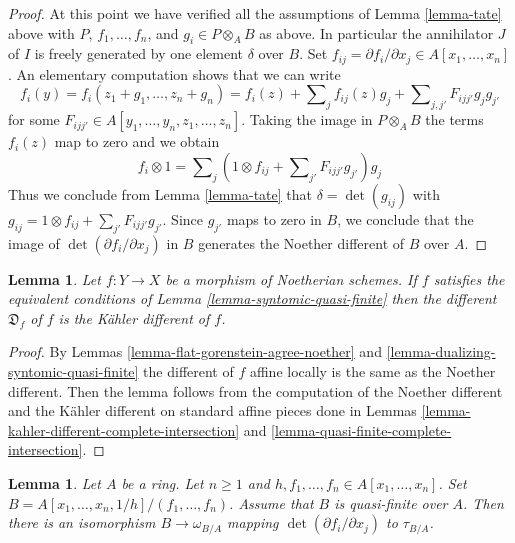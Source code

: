 \documentclass{stacks-project}
\theoremstyle{plain}
\newtheorem{lemma}[subsection]{Lemma}
\theoremstyle{definition}
\theoremstyle{remark}
\numberwithin{equation}{subsection}
\begin{document}
\begin{proof}
\medskip\noindent
At this point we have verified all the assumptions of Lemma \ref{lemma-tate}
above with $P$, $f_1, \ldots, f_n$, and $g_i \in P \otimes_A B$ as above.
In particular the annihilator $J$ of $I$ is freely generated by one
element $\delta$ over $B$.
Set $f_{ij} = \partial f_i/\partial x_j \in A[x_1, \ldots, x_n]$.
An elementary computation shows that we can write
$$
f_i(y) =
f_i(z_1 + g_1, \ldots, z_n + g_n) =
f_i(z) + \sum\nolimits_j f_{ij}(z) g_j +
\sum\nolimits_{j, j'} F_{ijj'}g_jg_{j'}
$$
for some $F_{ijj'} \in A[y_1, \ldots, y_n, z_1, \ldots, z_n]$.
Taking the image in $P \otimes_A B$ the terms $f_i(z)$ map to
zero and we obtain
$$
f_i \otimes 1 = \sum\nolimits_j
\left(1 \otimes f_{ij} + \sum\nolimits_{j'} F_{ijj'}g_{j'}\right)g_j
$$
Thus we conclude from Lemma \ref{lemma-tate}
that $\delta = \det(g_{ij})$ with
$g_{ij} = 1 \otimes f_{ij} + \sum_{j'} F_{ijj'}g_{j'}$.
Since $g_{j'}$ maps to zero in $B$, we conclude
that the image of $\det(\partial f_i/\partial x_j)$ in $B$
generates the Noether different of $B$ over $A$.
\end{proof}

\begin{lemma}
\label{lemma-different-syntomic-quasi-finite}
Let $f : Y \to X$ be a morphism of Noetherian schemes. If $f$
satisfies the equivalent conditions of Lemma \ref{lemma-syntomic-quasi-finite}
then the different $\mathfrak{D}_f$ of $f$ is the K\"ahler different
of $f$.
\end{lemma}

\begin{proof}
By Lemmas \ref{lemma-flat-gorenstein-agree-noether} and
\ref{lemma-dualizing-syntomic-quasi-finite}
the different of $f$ affine locally is the same as the
Noether different. Then the lemma follows from the
computation of the Noether different and the K\"ahler
different on standard affine pieces done in
Lemmas \ref{lemma-kahler-different-complete-intersection} and
\ref{lemma-quasi-finite-complete-intersection}.
\end{proof}

\begin{lemma}
\label{lemma-different-quasi-finite-complete-intersection}
Let $A$ be a ring. Let $n \geq 1$ and
$h, f_1, \ldots, f_n \in A[x_1, \ldots, x_n]$.
Set $B = A[x_1, \ldots, x_n, 1/h]/(f_1, \ldots, f_n)$.
Assume that $B$ is quasi-finite over $A$.
Then there is an isomorphism $B \to \omega_{B/A}$
mapping $\det(\partial f_i/\partial x_j)$ to $\tau_{B/A}$.
\end{lemma}
\end{document}
